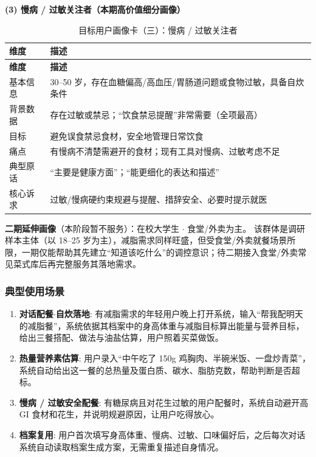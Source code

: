 \documentclass[12pt,a4paper]{ctexart}
\begin{document}
\noindent \textbf{(3) 慢病 / 过敏关注者（本期高价值细分画像）}

\begin{xltabular}{\linewidth}{p{2.0cm}L}
\caption{目标用户画像卡（三）：慢病 / 过敏关注者} \\
\toprule
\textbf{维度} & \textbf{描述} \\
\midrule
\endfirsthead
\toprule
\textbf{维度} & \textbf{描述} \\
\midrule
\endhead
基本信息 & 30--50 岁，存在血糖偏高/高血压/胃肠道问题或食物过敏，具备自炊条件 \\
背景数据 & 存在过敏或禁忌；“饮食禁忌提醒”非常需要（全项最高） \\
目标 & 避免误食禁忌食材，安全地管理日常饮食 \\
痛点 & 有慢病不清楚需避开的食材；现有工具对慢病、过敏考虑不足 \\
典型原话 & “主要是健康方面”；“能更细化的表达和描述” \\
核心诉求 & 过敏/慢病硬约束规避与提醒、措辞安全、必要时提示就医 \\
\bottomrule
\end{xltabular}

\noindent \textbf{二期延伸画像}（本阶段暂不服务）：在校大学生 $\cdot$ 食堂/外卖为主。
该群体是调研样本主体（以 18--25 岁为主），减脂需求同样旺盛，但受食堂/外卖就餐场景所限，一期仅能帮助其先建立“知道该吃什么”的调控意识；待二期接入食堂/外卖常见菜式库后再完整服务其落地需求。

\subsubsection{典型使用场景}
\begin{enumerate}
  \item \textbf{对话配餐$\cdot$自炊落地}: 有减脂需求的年轻用户晚上打开系统，输入“帮我配明天的减脂餐”，系统依据其档案中的身高体重与减脂目标算出能量与营养目标，给出三餐搭配、做法与油盐估算，用户照着买菜做饭。
  \item \textbf{热量营养素估算}: 用户录入“中午吃了 150g 鸡胸肉、半碗米饭、一盘炒青菜”，系统自动给出这一餐的总热量及蛋白质、碳水、脂肪克数，帮助判断是否超标。
  \item \textbf{慢病 / 过敏安全配餐}: 有糖尿病且对花生过敏的用户配餐时，系统自动避开高 GI 食材和花生，并说明规避原因，让用户吃得放心。
  \item \textbf{档案复用}: 用户首次填写身高体重、慢病、过敏、口味偏好后，之后每次对话系统自动读取档案生成方案，无需重复描述自身情况。
\end{enumerate}
\end{document}

